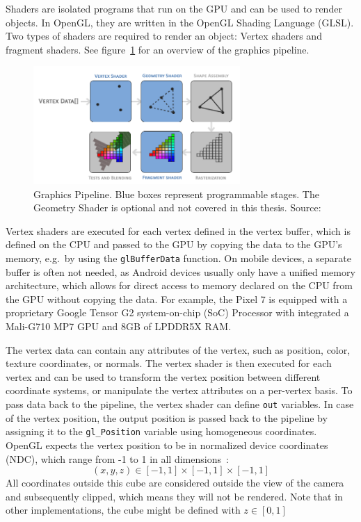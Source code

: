 Shaders are isolated programs that run on the GPU and can be used to render objects.
In OpenGL, they are written in the OpenGL Shading Language (GLSL).
Two types of shaders are required to render an object: Vertex shaders and fragment shaders.
See figure~\ref{fig:graphics-pipeline} for an overview of the graphics pipeline.
\begin{figure}[h!]
    \centering
    \includegraphics[width=0.70\textwidth]{images/graphics-pipeline}
    \caption{Graphics Pipeline. Blue boxes represent programmable stages. The Geometry Shader is optional and not covered in this thesis. Source:~\cite{de_vries_learn_2020}}
    \label{fig:graphics-pipeline}
\end{figure}

Vertex shaders are executed for each vertex defined in the vertex buffer, which is defined on the CPU and
passed to the GPU by copying the data to the GPU's memory, e.g.\ by using the \texttt{glBufferData} function.
On mobile devices, a separate buffer is often not needed, as Android devices usually only have a unified memory architecture,
which allows for direct access to memory declared on the CPU from the GPU without copying the data.
For example, the Pixel 7 is equipped with a proprietary Google Tensor G2 system-on-chip (SoC) Processor with integrated a
Mali-G710 MP7 GPU and 8GB of LPDDR5X RAM\@{}.

The vertex data can contain any attributes of the vertex, such as position, color, texture coordinates, or normals.
The vertex shader is then executed for each vertex and can be used to transform the vertex position between different coordinate systems,
or manipulate the vertex attributes on a per-vertex basis.
To pass data back to the pipeline, the vertex shader can define \texttt{out} variables.
In case of the vertex position, the output position is passed back to the
pipeline by assigning it to the \texttt{gl\_Position} variable using homogeneous coordinates.
OpenGL expects the vertex position to be in normalized device coordinates (NDC),
which range from -1 to 1 in all dimensions~\cite{dorner_virtual_2019}:
\begin{equation}
(x, y, z)
    \in [-1, 1] \times [-1, 1] \times [-1, 1]
\end{equation}
All coordinates outside this cube are considered outside the view of the camera and subsequently clipped,
which means they will not be rendered.
Note that in other implementations, the cube might be defined with $z \in [0, 1]$~\cite{dorner_virtual_2019}

